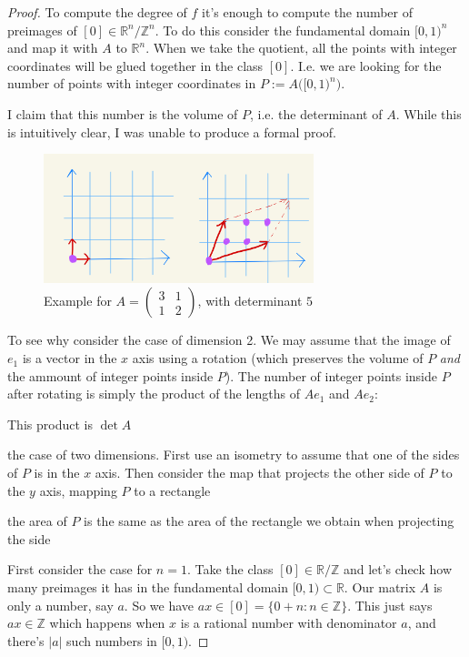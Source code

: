 \begin{proof}\leavevmode
	To compute the degree of \(f \) it's enough to compute the number of preimages of \([0] \in \mathbb{R}^n/\mathbb{Z}^n\). To do this consider the fundamental domain \([0,1)^n\) and map it with \(A\) to  \(\mathbb{R}^n\). When we take the quotient, all the points with integer coordinates will be glued together in the class \([0]\). I.e. we are looking for the number of points with integer coordinates in \(P:=A\Big( [0,1)^n \Big)\).

	I claim that this number is the volume of \(P\), i.e. the determinant of  \(A\). While this is intuitively clear, I was unable to produce a formal proof.

	\begin{figure}[H]
		\centering
		\includegraphics[width=0.7\textwidth]{fig2}
		\caption*{Example for \(A=\begin{pmatrix}3&1\\ 1&2\end{pmatrix}\), with determinant \(5\)}
	\end{figure}
\iffalse

	To see why consider the case of dimension 2. We may assume that the image of \(e_1\) is a vector in the \(x\) axis using a rotation (which preserves the volume of \(P\) \textit{and} the ammount of integer points inside \(P\)). The number of integer points inside \(P\) after rotating is simply the product of the lengths of \(Ae_1\) and \(Ae_2\):


	This product is \(\det A\)


	the case of two dimensions. First use an isometry to assume that one of the sides of \(P\) is in the \(x\) axis. Then consider the map that projects the other side of \(P\) to the \(y\) axis, mapping \(P\) to a rectangle

	the area of \(P\) is the same as the area of the rectangle we obtain when projecting the side
	
	First consider the case for \(n=1\). Take the class \([0] \in \mathbb{R}/\mathbb{Z}\) and let's check how many preimages it has in the fundamental domain \([0,1) \subset \mathbb{R}\). Our matrix \(A\) is only a number, say \(a\). So we have \(ax \in [0]=\{0+n:n \in \mathbb{Z}\}\). This just says \(ax \in \mathbb{Z}\) which happens when \(x\) is a rational number with  denominator \(a\), and there's  \(|a|\) such numbers in \([0,1)\).


\end{proof}
